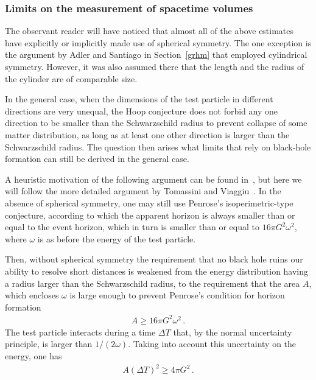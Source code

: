\documentclass{article}
\def\beqn{\begin{eqnarray}}
\def\eeqn{\end{eqnarray}}
\begin{document}
\subsubsection{Limits on the measurement of spacetime volumes}
\label{volumes}

The observant reader will have noticed that almost all of the above estimates have
explicitly or implicitly made use of spherical symmetry. The one exception is 
the argument by Adler and Santiago in Section~\ref{grhm} that employed cylindrical symmetry.  
However, it was also assumed there that the length and the radius of the cylinder
are of comparable size. 

In the general case, when the dimensions of the test particle in different directions
are very unequal, the Hoop conjecture  does not forbid any
one direction to be smaller than the Schwarzschild radius to prevent
collapse of some matter distribution, as long as at least
one other direction is larger than the Schwarzschild radius. The question
then arises what limits that rely on black-hole formation can still
be derived in the general case.

A heuristic motivation of the following argument can be found in~\cite{Doplicher:1994tu}, but
here we will follow the more detailed argument by Tomassini and Viaggiu~\cite{Tomassini:2011yu}.
In the absence of spherical symmetry, one may still use Penrose's isoperimetric-type conjecture, 
according to which the apparent horizon is always smaller than or equal to the
event horizon, which in turn is smaller than or equal to $16 \pi G^2 \omega^2$, where $\omega$
is as before the energy of the test particle. 

Then, without spherical symmetry the requirement that no black hole ruins our
ability to resolve short distances is weakened from the energy distribution having a
radius larger than the Schwarzschild radius, to the requirement that
 the area $A$, which encloses $\omega$ is large
enough to prevent Penrose's condition for horizon formation
\beqn
A \geq 16 \pi G^2 \omega^2 \,. \label{16}
\eeqn
The test particle interacts during a time $\Delta T$ that, by the normal uncertainty principle, 
is larger than $1/(2 \omega)$. 
Taking into account this uncertainty on the energy, one has
\beqn
A (\Delta T)^2 \geq 4 \pi G^2 \,. \label{this2}
\eeqn
\end{document}
